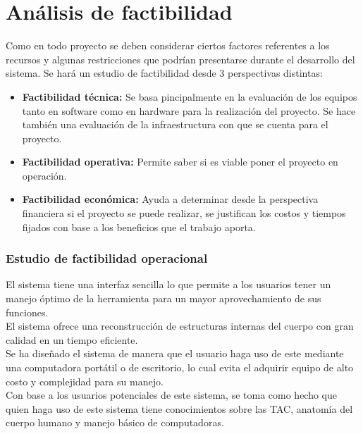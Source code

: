 \documentclass[12pt]{report}
\begin{document}
\section{Análisis de factibilidad}
Como en todo proyecto se deben considerar ciertos factores referentes a los recursos y algunas restricciones que podrían presentarse durante el desarrollo del sistema. Se hará un estudio de factibilidad
desde 3 perspectivas distintas:
\begin{itemize}
\item \textbf{Factibilidad técnica: }Se basa pincipalmente en la evaluación de los equipos tanto en software como en hardware para la realización del proyecto. Se hace también una evaluación de la infraestructura
con que se cuenta para el proyecto.
\item \textbf{Factibilidad operativa: }Permite saber si es viable poner el proyecto en operación.
\item \textbf{Factibilidad económica: }Ayuda a determinar desde la perspectiva financiera si el proyecto se puede realizar, se justifican los costos y tiempos fijados con base a los beneficios que el trabajo aporta.
\end{itemize}

\subsubsection{Estudio de factibilidad operacional}
El sistema tiene una interfaz sencilla lo que permite a los usuarios tener un manejo óptimo de la herramienta para un mayor aprovechamiento de sus funciones.\\

El sistema ofrece una reconstrucción de estructuras internas del cuerpo con gran calidad en un tiempo eficiente.\\

Se ha diseñado el sistema de manera que el usuario haga uso de este mediante una computadora portátil o de escritorio, lo cual evita el adquirir equipo de alto costo y complejidad para su manejo.\\

Con base a los usuarios potenciales de este sistema, se toma como hecho que quien haga uso de este sistema tiene conocimientos sobre las TAC, anatomía del cuerpo humano y manejo básico de computadoras.\\
\end{document}
